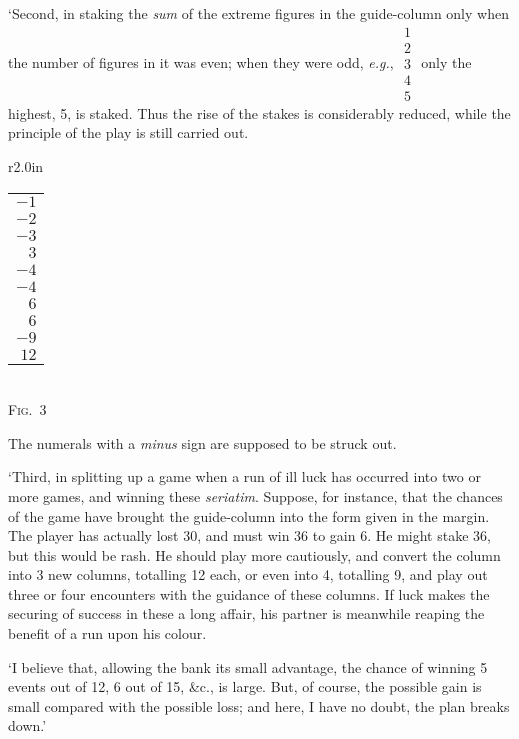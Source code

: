 \documentclass[letterpaper,12pt,oneside,openany]{memoir}
\begin{document}
`Second, in staking the \emph{sum} of the extreme figures
in the guide-column only when the number of figures
in it was even; when they were odd, \textit{e.g.},
$\begin{matrix}1\\2\\3\\4\\5\end{matrix}$ only the
highest, 5, is staked. Thus the rise of the stakes is
considerably reduced, while the principle of the play
is still carried out.

\begin{wrapfigure}[17]{r}{2.0in}
    \begin{center}
    \begin{tabular}{r}
        $-1$ \\
        $-2$ \\
        $-3$ \\
        $ 3$ \\
        $-4$ \\
        $-4$ \\
        $ 6$ \\
        $ 6$ \\
        $-9$ \\
        $12$
    \end{tabular}\\
    \textsc{Fig.~3}\\
    \end{center}
    {\small The numerals with a \textit{minus} sign are supposed
    to be struck out.}
\end{wrapfigure}
`Third, in splitting up a game when a run of ill luck
has occurred into two or more games, and winning
these \textit{seriatim}. Suppose, for instance, that the chances
of the game have brought the guide-column into the
form given in the margin. The player has actually lost
30, and must win 36 to gain 6. He might stake 36,
but this would be rash. He should play more cautiously,
and convert the column into 3 new columns,
totalling 12 each, or even into 4, totalling 9,
and play out three or four encounters with
the guidance of these columns. If luck
makes the securing of success in these a
long affair, his partner is meanwhile reaping
the benefit of a run upon his colour.

`I believe that, allowing the bank its small advantage,
the chance of winning 5 events out of 12, 6 out of
15, \&c., is large. But, of course, the possible gain is
small compared with the possible loss; and here, I have
no doubt, the plan breaks down.'
\end{document}
